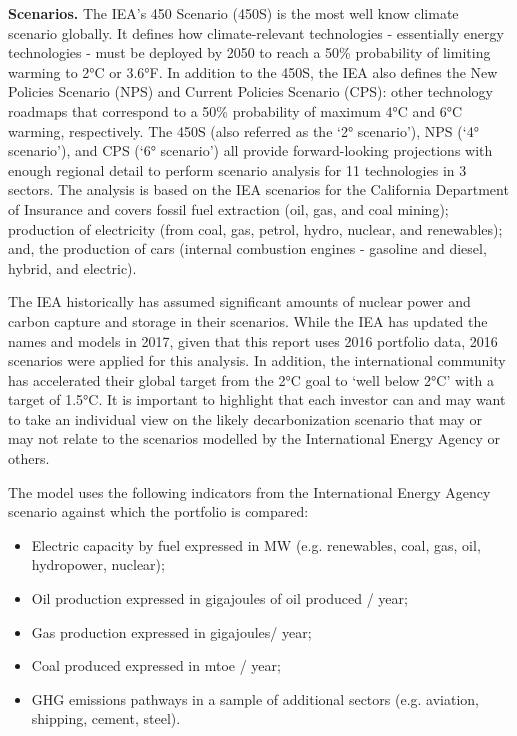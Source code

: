 \documentclass[10pt,table,a4]{article}\usepackage[]{graphicx}\usepackage[]{color}
\begin{document}
\begin{multicols}{2}
		\textbf{Scenarios.} The IEA's 450 Scenario (450S) is the most well know climate scenario globally. It defines how climate-relevant technologies - 	essentially energy technologies - must be deployed by 2050 to reach a 50\% probability of limiting warming to 2°C or 3.6°F. In addition to the 450S, the IEA also defines the New Policies Scenario (NPS) and Current Policies Scenario (CPS): other technology roadmaps that correspond to a 50\% probability of maximum 4°C and 6°C warming, respectively. The 450S (also referred as the `2° scenario'), NPS (`4° scenario'), and CPS (`6° scenario') all provide forward-looking projections with enough regional detail to perform scenario analysis for 11 technologies in 3 sectors. The analysis is based on the IEA scenarios for the California Department of Insurance and covers fossil fuel extraction (oil, gas, and coal mining); production of electricity (from coal, gas, petrol, hydro, nuclear, and renewables); and, the production of cars (internal combustion engines - gasoline and diesel, hybrid, and electric).
		
		The IEA historically has assumed significant amounts of nuclear power and carbon capture and storage in their scenarios. While the IEA has updated the names and models in 2017, given that this report uses 2016 portfolio data, 2016 scenarios were applied for this analysis. In addition, the international community has accelerated their global target from the 2°C goal to `well below 2°C' with a target of 1.5°C. It is important to highlight that each investor can and may want to take an individual view on the likely decarbonization scenario that may or may not relate to the scenarios modelled by the International Energy Agency or others.
		
		The model uses the following indicators from the International Energy Agency scenario against which the portfolio is compared:
		\begin{itemize}
			\item{Electric capacity by fuel expressed in MW (e.g. renewables, coal, gas, oil, hydropower, nuclear);}
			\item{Oil production expressed in gigajoules of oil produced / year;}
			\item{Gas production expressed in gigajoules/ year;}
			\item{Coal produced expressed in mtoe / year;}
			\item{GHG emissions pathways in a sample of additional sectors (e.g. aviation, shipping, cement, steel).}
		\end{itemize}
		

\end{multicols}
\end{document}
